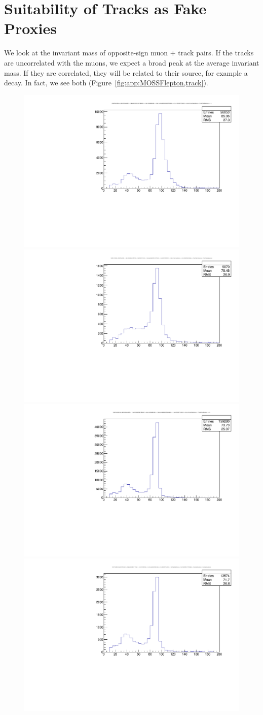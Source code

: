 \chapter{Suitability of Tracks as Fake Proxies}
\label{app:MOSSFlepton,track}

We look at the invariant mass of opposite-sign muon + track pairs. If the tracks are uncorrelated with the muons, we expect a broad peak at the average invariant mass. If they are correlated, they will be related to their source, for example a \Z decay. In fact, we see both (Figure~\ref{fig:app:MOSSFlepton,track}).

\begin{figure}
\begin{center}
	\includegraphics[width=.5\textwidth]{Appendix/study_OSSFCLOSEMLL_electron,track_dileptons-1fake}%
	\includegraphics[width=.5\textwidth]{Appendix/study_OSSFCLOSEMLL_electron,track_1fake}\\
	\includegraphics[width=.5\textwidth]{Appendix/study_OSSFCLOSEMLL_muon,track_dileptons-1fake}%
	\includegraphics[width=.5\textwidth]{Appendix/study_OSSFCLOSEMLL_muon,track_1fake}

\end{center}
\end{figure}
